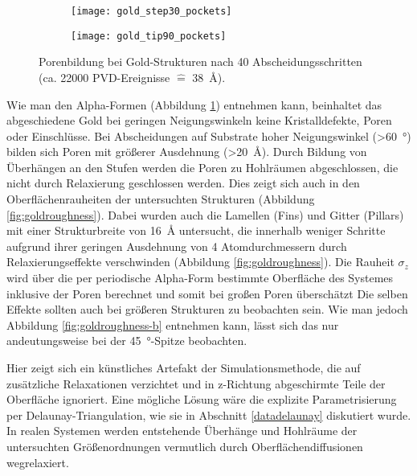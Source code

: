 \begin{figure}[p]
  \captionsetup[subfigure]{singlelinecheck=false}
  \def\subfigwidth{0.49\textwidth}

  \begin{subfigure}[t]{\subfigwidth}
    \texttt{[image: gold\_step30\_pockets]}
    \label{fig:goldpockets-a}
  \end{subfigure}
  \hfill
  \begin{subfigure}[t]{\subfigwidth}
    \texttt{[image: gold\_tip90\_pockets]}
    \label{fig:goldpockets-b}
  \end{subfigure}

  \caption[Porenbildung bei Gold-Strukturen]{Porenbildung bei Gold-Strukturen nach 40 Abscheidungsschritten (ca. \num{22000} PVD-Ereignisse $\hat{=}$ \SI{38}{\angstrom}).
  }
  \label{fig:goldpockets}

\end{figure}

Wie man den Alpha-Formen (Abbildung \ref{fig:goldpockets-a}) entnehmen kann, beinhaltet das abgeschiedene Gold bei geringen Neigungswinkeln keine Kristalldefekte, Poren oder Einschlüsse.
Bei Abscheidungen auf Substrate hoher Neigungswinkel (>\SI{60}{\degree}) bilden sich Poren mit größerer Ausdehnung (>\SI{20}{\angstrom}).
Durch Bildung von Überhängen an den Stufen werden die Poren zu Hohlräumen abgeschlossen, die nicht durch Relaxierung geschlossen werden.
Dies zeigt sich auch in den Oberflächenrauheiten der untersuchten Strukturen (Abbildung \ref{fig:goldroughness}).
Dabei wurden auch die Lamellen (Fins) und Gitter (Pillars) mit einer Strukturbreite von \SI{16}{\angstrom} untersucht, die innerhalb weniger Schritte aufgrund ihrer geringen Ausdehnung von \num{4} Atomdurchmessern durch Relaxierungseffekte verschwinden (Abbildung \ref{fig:goldroughness}).
Die Rauheit $\sigma_z$ wird über die per periodische Alpha-Form bestimmte Oberfläche des Systemes inklusive der Poren berechnet und somit bei großen Poren überschätzt
Die selben Effekte sollten auch bei größeren Strukturen zu beobachten sein.
Wie man jedoch Abbildung \ref{fig:goldroughness-b} entnehmen kann, lässt sich das nur andeutungsweise bei der \SI{45}{\degree}-Spitze beobachten.

Hier zeigt sich ein künstliches Artefakt der Simulationsmethode, die auf zusätzliche Relaxationen verzichtet und in z-Richtung abgeschirmte Teile der Oberfläche ignoriert.
Eine mögliche Lösung wäre die explizite Parametrisierung per Delaunay-Triangulation, wie sie in Abschnitt \ref{datadelaunay} diskutiert wurde.
In realen Systemen werden entstehende Überhänge und Hohlräume der untersuchten Größenordnungen vermutlich durch Oberflächendiffusionen wegrelaxiert.

